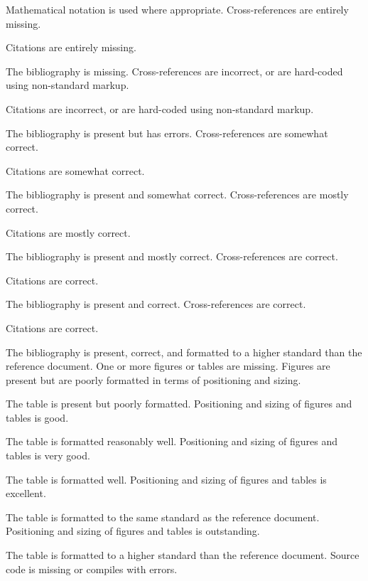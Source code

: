 \documentclass{../../../fal_assignment}
\begin{document}
\begin{markingrubric}
			\par Mathematical notation is used where appropriate.
		\grade\fail Cross-references are entirely missing.
			\par Citations are entirely missing.
			\par The bibliography is missing.
		\grade Cross-references are incorrect, or are hard-coded using non-standard markup.
			\par Citations are incorrect, or are hard-coded using non-standard markup.
			\par The bibliography is present but has errors.
		\grade Cross-references are somewhat correct.
			\par Citations are somewhat correct.
			\par The bibliography is present and somewhat correct.
		\grade Cross-references are mostly correct.
			\par Citations are mostly correct.
			\par The bibliography is present and mostly correct.
		\grade Cross-references are correct.
			\par Citations are correct.
			\par The bibliography is present and correct.
		\grade Cross-references are correct.
			\par Citations are correct.
			\par The bibliography is present, correct, and formatted to a higher standard than the reference document.
		\grade\fail One or more figures or tables are missing.
		\grade Figures are present but are poorly formatted in terms of positioning and sizing.
			\par The table is present but poorly formatted.
		\grade Positioning and sizing of figures and tables is good.
			\par The table is formatted reasonably well.
		\grade Positioning and sizing of figures and tables is very good.
			\par The table is formatted well.
		\grade Positioning and sizing of figures and tables is excellent.
			\par The table is formatted to the same standard as the reference document.
		\grade Positioning and sizing of figures and tables is outstanding.
			\par The table is formatted to a higher standard than the reference document.
		\grade\fail Source code is missing or compiles with errors.

\end{markingrubric}
\end{document}
